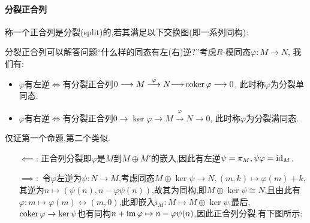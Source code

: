 \documentclass[11pt]{article} %
\begin{document}
\paragraph{分裂正合列}
称一个正合列是分裂(split)的,若其满足以下交换图(即一系列同构):
\begin{center}
\end{center}

分裂正合列可以解答问题``什么样的同态有左(右)逆?''考虑$R$-模同态$\varphi:M\to N$, 我们有:
\begin{itemize}
    \item $\varphi$有左逆$\iff$有分裂正合列$0\longrightarrow M \overset{\varphi}{\longrightarrow} N {\longrightarrow} \operatorname{coker}\varphi \longrightarrow 0$, 此时称$\varphi$为分裂单同态.
    \item $\varphi$有右逆$\iff$有分裂正合列$0\longrightarrow \ker\varphi {\longrightarrow} M \overset{\varphi}{\longrightarrow} N \longrightarrow 0$, 此时称$\varphi$为分裂满同态.
\end{itemize}
{\small
仅证第一个命题,第二个类似.\begin{itemize}
    \item[$\impliedby$:]正合列分裂即$\varphi$是$M$到$M\oplus M'$的嵌入,因此有左逆$\psi=\pi_{M}, \psi\varphi=\mathrm{id}_M$.
    \item[$\implies:$] 令$\varphi$左逆为$\psi:N\to M$,考虑同态$M\oplus \ker\psi\to N, (m,k)\mapsto \varphi(m)+k$,其逆为$n\mapsto (\psi(n), n-\varphi\psi(n))$,故其为同构,即$M\oplus \ker\psi\cong N$,且由此有$\varphi:m\mapsto \varphi(m)\leftrightarrow (m,0)$,此即嵌入$i_M:M\mapsto M\oplus \ker\psi$.最后,$\operatorname{coker}\varphi\to \ker\psi$也有同构$n+\operatorname{im}\varphi\mapsto n-\varphi\psi(n)$,因此正合列分裂.有下图所示:
\begin{center}
\end{center}
\end{itemize}}
\end{document}
